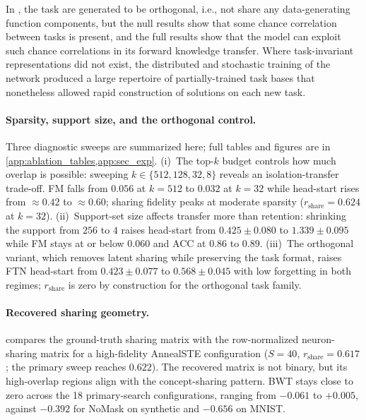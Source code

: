 \documentclass[11pt]{article}
\begin{document}
In , the task are generated to be orthogonal, i.e., not share any data-generating function components, but the null results show that some chance correlation between tasks is present, and the full results show that the model can exploit such chance correlations in its forward knowledge transfer. Where task-invariant representations did not exist, the distributed and stochastic training of the network produced a large repertoire of partially-trained task bases that nonetheless allowed rapid construction of solutions on each new task.

\paragraph{Sparsity, support size, and the orthogonal control.}
Three diagnostic sweeps are summarized here; full tables and figures are in \cref{app:ablation_tables,app:sec_exp}. (i)~The top-$k$ budget controls how much overlap is possible: sweeping $k\in\{512,128,32,8\}$ reveals an isolation-transfer trade-off. FM falls from $0.056$ at $k{=}512$ to $0.032$ at $k{=}32$ while head-start rises from ${\approx}0.42$ to ${\approx}0.60$; sharing fidelity peaks at moderate sparsity ($r_{\mathrm{share}}{=}0.624$ at $k{=}32$). (ii)~Support-set size affects transfer more than retention: shrinking the support from $256$ to $4$ raises head-start from $0.425{\pm}0.080$ to $1.339{\pm}0.095$ while FM stays at or below $0.060$ and ACC at $0.86$ to $0.89$. (iii)~The orthogonal variant, which removes latent sharing while preserving the task format, raises FTN head-start from $0.423{\pm}0.077$ to $0.568{\pm}0.045$ with low forgetting in both regimes; $r_{\mathrm{share}}$ is zero by construction for the orthogonal task family.

\paragraph{Recovered sharing geometry.}
 compares the ground-truth sharing matrix with the row-normalized neuron-sharing matrix for a high-fidelity AnnealSTE configuration ($S{=}40$, $r_{\mathrm{share}}{=}0.617$; the primary sweep reaches $0.622$). The recovered matrix is not binary, but its high-overlap regions align with the concept-sharing pattern. BWT stays close to zero across the 18 primary-search configurations, ranging from $-0.061$ to $+0.005$, against $-0.392$ for NoMask on synthetic and $-0.656$ on MNIST.
\end{document}

